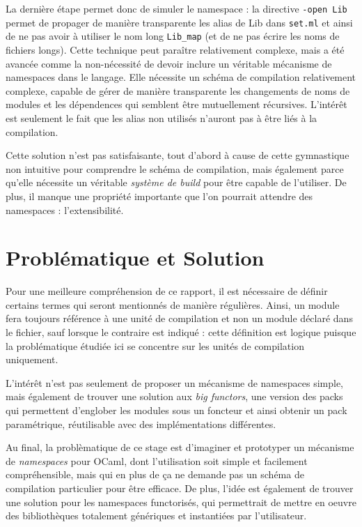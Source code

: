 \documentclass[11pt,a4paper]{report}
\begin{document}
La dernière étape permet donc de simuler le namespace : la directive
\texttt{-open Lib} permet de propager de manière transparente les alias de Lib
dans \texttt{set.ml} et ainsi de ne pas avoir à utiliser le nom long
\texttt{Lib\_map} (et de ne pas écrire les noms de fichiers longs). Cette
technique peut paraître relativement complexe, mais a été avancée comme la
non-nécessité de devoir inclure un véritable mécanisme de namespaces dans le
langage. Elle nécessite un schéma de compilation relativement complexe, capable
de gérer de manière transparente les changements de noms de modules et les
dépendences qui semblent être mutuellement récursives. L'intérêt est seulement
le fait que les alias non utilisés n'auront pas à être liés à la compilation.

Cette solution n'est pas satisfaisante, tout d'abord à cause de cette
gymnastique non intuitive pour comprendre le schéma de compilation, mais
également parce qu'elle nécessite un véritable \emph{système de build} pour être
capable de l'utiliser. De plus, il manque une propriété importante que l'on
pourrait attendre des namespaces : l'extensibilité.

\chapter{Problématique et Solution}

Pour une meilleure compréhension de ce rapport, il est nécessaire de définir
certains termes qui seront mentionnés de manière régulières. Ainsi, un module
fera toujours référence à une unité de compilation et non un module déclaré dans
le fichier, sauf lorsque le contraire est indiqué : cette définition est logique
puisque la problématique étudiée ici se concentre sur les unités de compilation
uniquement. 


L'intérêt n'est pas seulement de proposer un mécanisme de namespaces simple,
mais également de trouver une solution aux \emph{big functors}, une version des
packs qui permettent d'englober les modules sous un foncteur et ainsi obtenir
un pack paramétrique, réutilisable avec des implémentations
différentes. 

\medskip

Au final, la problèmatique de ce stage est d'imaginer et prototyper un mécanisme
de \emph{namespaces} pour OCaml, dont l'utilisation soit simple et facilement
compréhensible, mais qui en plus de ça ne demande pas un schéma de compilation
particulier pour être efficace. De plus, l'idée est également de trouver une
solution pour les namespaces functorisés, qui permettrait de mettre en oeuvre
des bibliothèques totalement génériques et instantiées par l'utilisateur.
\end{document}
